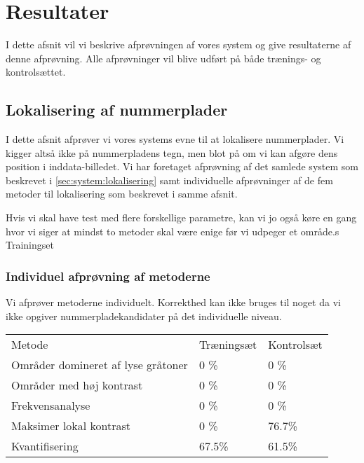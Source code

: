 \section{Resultater}
\label{sec:resultater}

I dette afsnit vil vi beskrive afprøvningen af vores system og give resultaterne af denne afprøvning. Alle afprøvninger vil blive udført på både trænings- og kontrolsættet.


\subsection{Lokalisering af nummerplader}
I dette afsnit afprøver vi vores systems evne til at lokalisere nummerplader. Vi kigger altså ikke på nummerpladens tegn, men blot på om vi kan afgøre dens position i inddata-billedet. Vi har foretaget afprøvning af det samlede system som beskrevet i \vref{sec:system:lokalisering} samt individuelle afprøvninger af de fem metoder til lokalisering som beskrevet i samme afsnit.

Hvis vi skal have test med flere forskellige parametre, kan vi jo også køre en gang hvor vi siger at mindst to metoder skal være enige før vi udpeger et område.s
Trainingset


\subsubsection{Individuel afprøvning af metoderne}
Vi afprøver metoderne individuelt. Korrekthed kan ikke bruges til noget da vi ikke opgiver nummerpladekandidater på det individuelle niveau.
\begin{center}
\begin{tabular}{|l|l|l|}
\hline
\rowcolor[gray]{0.9} \multicolumn{3}{|>{\columncolor[gray]{0.9}}c|}{\textbf{..}} \\ \hline
Metode & Træningsæt & Kontrolsæt\\ \hline
Områder domineret af lyse gråtoner &  0 \% & 0 \%\\ \hline
Områder med høj kontrast &  0 \% & 0 \%\\ \hline
Frekvensanalyse &  0 \% & 0 \%\\ \hline
Maksimer lokal kontrast &  0 \% & 76.7\%\\ \hline
Kvantifisering &  67.5\% & 61.5\%\\
\hline
\end{tabular}
\end{center}


